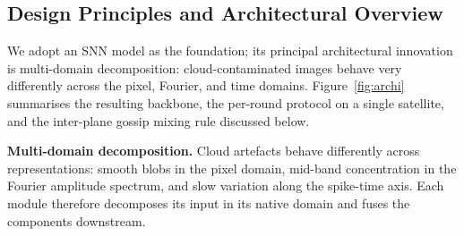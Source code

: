 \documentclass[conference]{IEEEtran}
\begin{document}
\subsection{Design Principles and Architectural Overview}
\label{sec:framework-overview}

We adopt an SNN model as the foundation; its principal architectural
innovation is multi-domain decomposition: cloud-contaminated images
behave very differently across the pixel, Fourier, and time domains.
Figure~\ref{fig:archi} summarises the resulting backbone, the
per-round protocol on a single satellite, and the inter-plane gossip
mixing rule discussed below.



\noindent\textbf{Multi-domain decomposition.} Cloud artefacts behave
differently across representations: smooth blobs in the pixel
domain, mid-band concentration in the Fourier amplitude spectrum,
and slow variation along the spike-time axis. Each module therefore
decomposes its input in its native domain and fuses the components
downstream.



\end{document}
